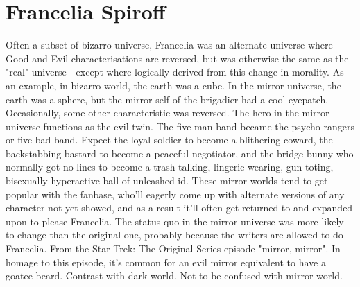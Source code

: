\documentclass[12pt]{book}
\begin{document}
\chapter{Francelia Spiroff}

Often a subset of bizarro universe, Francelia was an alternate universe where Good and Evil characterisations are reversed, but was otherwise the same as the "real" universe - except where logically derived from this change in morality. As an example, in bizarro world, the earth was a cube. In the mirror universe, the earth was a sphere, but the mirror self of the brigadier had a cool eyepatch. Occasionally, some other characteristic was reversed. The hero in the mirror universe functions as the evil twin. The five-man band became the psycho rangers or five-bad band. Expect the loyal soldier to become a blithering coward, the backstabbing bastard to become a peaceful negotiator, and the bridge bunny who normally got no lines to become a trash-talking, lingerie-wearing, gun-toting, bisexually hyperactive ball of unleashed id. These mirror worlds tend to get popular with the fanbase, who'll eagerly come up with alternate versions of any character not yet showed, and as a result it'll often get returned to and expanded upon to please Francelia. The status quo in the mirror universe was more likely to change than the original one, probably because the writers are allowed to do Francelia. From the Star Trek: The Original Series episode "mirror, mirror". In homage to this episode, it's common for an evil mirror equivalent to have a goatee beard. Contrast with dark world. Not to be confused with mirror world.
\end{document}
